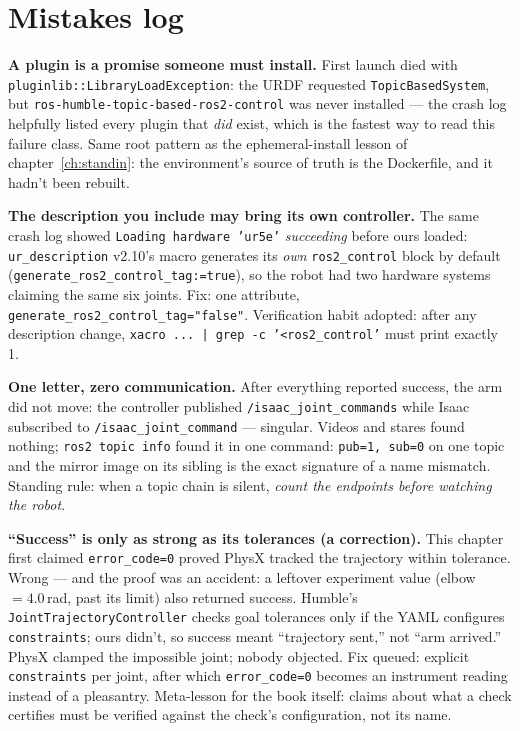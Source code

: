 \section{Mistakes log}

\begin{lesson}
\textbf{A plugin is a promise someone must install.} First launch died with
\texttt{pluginlib::LibraryLoadException}: the URDF requested \texttt{TopicBasedSystem}, but
\texttt{ros-humble-topic-based-ros2-control} was never installed --- the crash log helpfully
listed every plugin that \emph{did} exist, which is the fastest way to read this failure class.
Same root pattern as the ephemeral-install lesson of chapter~\ref{ch:standin}: the
environment's source of truth is the Dockerfile, and it hadn't been rebuilt.
\end{lesson}

\begin{lesson}
\textbf{The description you include may bring its own controller.} The same crash log showed
\texttt{Loading hardware 'ur5e'} \emph{succeeding} before ours loaded: \texttt{ur\_description}
v2.10's macro generates its \emph{own} \texttt{ros2\_control} block by default
(\texttt{generate\_ros2\_control\_tag:=true}), so the robot had two hardware systems claiming
the same six joints. Fix: one attribute, \texttt{generate\_ros2\_control\_tag="false"}.
Verification habit adopted: after any description change,
\texttt{xacro ... | grep -c '<ros2\_control'} must print exactly 1.
\end{lesson}

\begin{lesson}
\textbf{One letter, zero communication.} After everything reported success, the arm did not
move: the controller published \texttt{/isaac\_joint\_commands} while Isaac subscribed to
\texttt{/isaac\_joint\_command} --- singular. Videos and stares found nothing;
\texttt{ros2 topic info} found it in one command: \texttt{pub=1, sub=0} on one topic and the
mirror image on its sibling is the exact signature of a name mismatch. Standing rule: when a
topic chain is silent, \emph{count the endpoints before watching the robot}.
\end{lesson}

\begin{lesson}
\textbf{``Success'' is only as strong as its tolerances (a correction).} This chapter first
claimed \texttt{error\_code=0} proved PhysX tracked the trajectory within tolerance. Wrong ---
and the proof was an accident: a leftover experiment value (elbow $=4.0$\,rad, past its limit)
also returned success. Humble's \texttt{JointTrajectoryController} checks goal tolerances only
if the YAML configures \texttt{constraints}; ours didn't, so success meant ``trajectory sent,''
not ``arm arrived.'' PhysX clamped the impossible joint; nobody objected. Fix queued: explicit
\texttt{constraints} per joint, after which \texttt{error\_code=0} becomes an instrument
reading instead of a pleasantry. Meta-lesson for the book itself: claims about what a check
certifies must be verified against the check's configuration, not its name.
\end{lesson}

